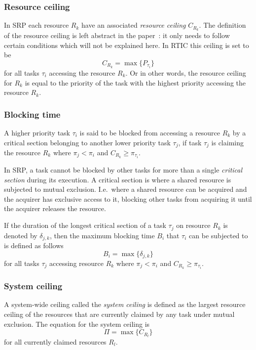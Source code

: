 \subsubsection{Resource ceiling}\label{theory:srp:definitions:resource}
In SRP each resource $R_k$ have an associated \emph{resource ceiling}
$C_{R_k}$. The definition of the resource ceiling is left abstract in the
paper~\cite{srp}: it only needs to follow certain conditions which will not be
explained here. In RTIC this ceiling is set to be
\begin{equation}
    C_{R_k} = \max\{P_{\tau_i}\}
\end{equation}
for all tasks $\tau_i$ accessing the resource $R_k$. Or in other words,
the resource ceiling for $R_k$ is equal to the priority of the task with the
highest priority accessing the resource $R_k$.

\subsubsection{Blocking time}\label{theory:srp:definitions:blocking}
A higher priority task $\tau_i$ is said to be blocked from accessing a resource
$R_k$ by a critical section belonging to another lower priority task $\tau_j$,
if task $\tau_j$ is claiming the resource $R_k$ where $\pi_j < \pi_i$ and
$C_{R_k} \geq \pi_{\tau_i}$.

In SRP, a task cannot be blocked by other tasks for more than a single
\emph{critical section} during its execution. A critical section is where a
shared resource is subjected to mutual exclusion. I.e.\ where a shared resource
can be acquired and the acquirer has exclusive access to it, blocking other
tasks from acquiring it until the acquirer releases the resource.

If the duration of the longest critical section of a task $\tau_j$ on resource
$R_k$ is denoted by $\delta_{j,k}$, then the maximum blocking time $B_i$
that $\tau_i$ can be subjected to is defined as follows
\begin{equation}
    B_i = \max\{\delta_{j,k}\}
\end{equation}
for all tasks $\tau_j$ accessing resource $R_k$ where $\pi_j < \pi_i$ and
$C_{R_k} \geq \pi_{\tau_i}$.

\subsubsection{System ceiling}\label{theory:srp:definitions:system}
A system-wide ceiling called the \emph{system ceiling} is defined as the
largest resource ceiling of the resources that are currently claimed by
any task under mutual exclusion. The equation for the system ceiling is
\begin{equation}
    \Pi = \max\{C_{R_l}\}
\end{equation}
for all currently claimed resources $R_l$.

